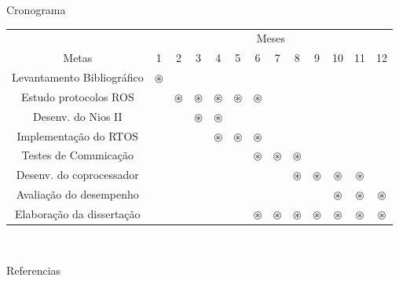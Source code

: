 \documentclass[10pt]{beamer}
\begin{document}
{
\begin{frame}{Cronograma}

    \begin{table}[h]
    	\centering

    	\vspace{0.2cm}
    	\begin{tabular}{c|cccccccccccc}
    		\toprule
    		 & \multicolumn{12}{c}{{\tiny Meses}}\\ 
    		{\tiny Metas} & {\tiny 1} & {\tiny 2} & {\tiny 3} & {\tiny 4} & {\tiny 5} & {\tiny 6} & {\tiny 7} & {\tiny 8} & {\tiny 9} & {\tiny 10} & {\tiny 11} & {\tiny 12} \\ 
    		\midrule  
    		\midrule                           
    		{\tiny Levantamento Bibliográfico}& $\circledast$ & & & & & & & & & & & \\
    		\hline
    		{\tiny Estudo protocolos ROS} & & $\circledast$ & $\circledast$ & $\circledast$ & $\circledast$ & $\circledast$ & & & & & &  \\
    		\hline
    		{\tiny Desenv. do Nios II} & & & $\circledast$ & $\circledast$ & & & & & & & &  \\
    		\hline
    		{\tiny Implementação } {\tiny do RTOS} & & & & $\circledast$ & $\circledast$ & $\circledast$ & & & & & &  \\
    		\hline
    		{\tiny Testes de Comunicação} & & & & & & $\circledast$ & $\circledast$ & $\circledast$ & & & &  \\
    		\hline
    		{\tiny Desenv. do coprocessador} & & & & & & & & $\circledast$ & $\circledast$ & $\circledast$ & $\circledast$ &  \\
    		\hline
    		{\tiny Avaliação do desempenho} & & & & & & & & & & $\circledast$ & $\circledast$ & $\circledast$ \\
    		\hline
    		{\tiny Elaboração da } {\tiny dissertação} & & & & & & $\circledast$ & $\circledast$ & $\circledast$ & $\circledast$ & $\circledast$ & $\circledast$ & $\circledast$\\
    		\bottomrule 
    
    	\end{tabular}
    	\\
    	\label{tab:crono}
    \end{table}
\end{frame}
}



\begin{frame}[allowframebreaks]{Referencias}

  
  
  
\end{frame}
\end{document}
